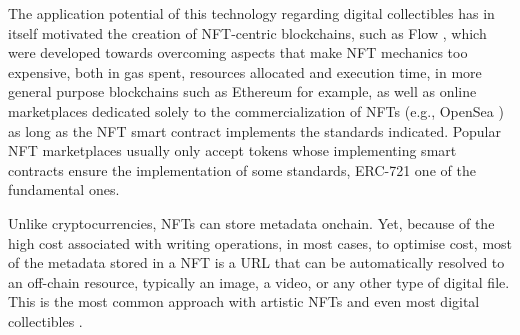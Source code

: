\documentclass[../main.tex]{subfiles}
\begin{document}
\par
The application potential of this technology regarding digital collectibles has in itself motivated the creation of NFT-centric blockchains, such as Flow \cite{Hentschel2019a}, which were developed towards overcoming aspects that make NFT mechanics too expensive, both in gas spent, resources allocated and execution time, in more general purpose blockchains such as Ethereum for example, as well as online marketplaces dedicated solely to the commercialization of NFTs (e.g., OpenSea \cite{OpenSea2024}) as long as the NFT smart contract implements the standards indicated. Popular NFT marketplaces usually only accept tokens whose implementing smart contracts ensure the implementation of some standards, ERC-721 one of the fundamental ones.
\par
Unlike cryptocurrencies, NFTs can store metadata onchain. Yet, because of the high cost associated with writing operations, in most cases, to optimise cost, most of the metadata stored in a NFT is a URL that can be automatically resolved to an off-chain resource, typically an image, a video, or any other type of digital file. This is the most common approach with artistic NFTs and even most digital collectibles \cite{Trautman2022}.
\end{document}
